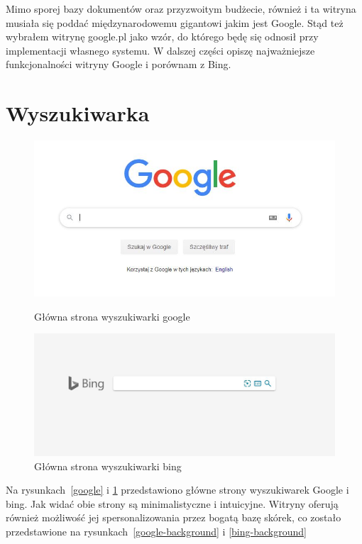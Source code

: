 \documentclass[licencjacka]{pracadypl}
\theoremstyle{definition}
\begin{document}
Mimo sporej bazy dokumentów oraz przyzwoitym budżecie, również i ta witryna musiała się poddać międzynarodowemu gigantowi jakim jest Google. 
Stąd też wybrałem witrynę google.pl jako wzór, do którego będę się odnosił przy implementacji własnego systemu.
W dalszej części opiszę najważniejsze funkcjonalności witryny Google i porównam z Bing.

\section{Wyszukiwarka}
\begin{figure}[!htb]
	\includegraphics[width=\linewidth]{img/google.jpg}
	\caption{Główna strona wyszukiwarki google}\label{google}
	\endminipage\hfill 
	\includegraphics[width=\linewidth]{img/bing}
	\caption{Główna strona wyszukiwarki bing}\label{bing}
	\endminipage
\end{figure}

Na rysunkach~\ref{google} i \ref{bing} przedstawiono główne strony wyszukiwarek Google i bing. Jak widać obie strony są minimalistyczne i intuicyjne. Witryny oferują również możliwość jej spersonalizowania przez bogatą bazę skórek, co zostało przedstawione na rysunkach~\ref{google-background} i \ref{bing-background}
\end{document}
